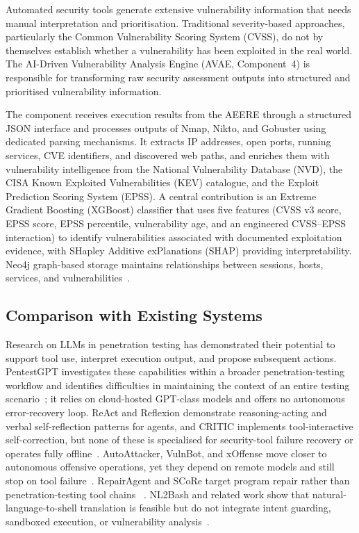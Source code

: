 Automated security tools generate extensive vulnerability information that
needs manual interpretation and prioritisation. Traditional severity-based
approaches, particularly the Common Vulnerability Scoring System (CVSS), do not
by themselves establish whether a vulnerability has been exploited in the
real world. The AI-Driven Vulnerability Analysis Engine (AVAE, Component~4) is
responsible for transforming raw security assessment outputs into structured and
prioritised vulnerability information.

The component receives execution results from the AEERE through a structured
JSON interface and processes outputs of Nmap, Nikto, and Gobuster using dedicated
parsing mechanisms. It extracts IP addresses, open ports, running services, CVE
identifiers, and discovered web paths, and enriches them with vulnerability
intelligence from the National Vulnerability Database (NVD), the CISA Known
Exploited Vulnerabilities (KEV) catalogue, and the Exploit Prediction Scoring
System (EPSS). A central contribution is an Extreme Gradient Boosting (XGBoost)
classifier that uses five features (CVSS v3 score, EPSS score, EPSS percentile,
vulnerability age, and an engineered CVSS--EPSS interaction) to identify
vulnerabilities associated with documented exploitation evidence, with SHapley
Additive exPlanations (SHAP) providing interpretability. Neo4j graph-based
storage maintains relationships between sessions, hosts, services, and
vulnerabilities~\cite{bozorgi2010beyond,sabottke2015vulnerability,lundberg2017shap,
chen2016xgboost,jacobs2023epss}.

\subsection{Comparison with Existing Systems}\label{sec:existing}

Research on LLMs in penetration testing has demonstrated their potential to
support tool use, interpret execution output, and propose subsequent actions.
PentestGPT investigates these capabilities within a broader penetration-testing
workflow and identifies difficulties in maintaining the context of an entire
testing scenario~\cite{deng2024pentestgpt}; it relies on cloud-hosted GPT-class
models and offers no autonomous error-recovery loop. ReAct and Reflexion
demonstrate reasoning-acting and verbal self-reflection patterns for agents, and
CRITIC implements tool-interactive self-correction, but none of these is
specialised for security-tool failure recovery or operates fully
offline~\cite{yao2023react,shinn2023reflexion,gou2024critic}. AutoAttacker,
VulnBot, and xOffense move closer to autonomous offensive operations, yet they
depend on remote models and still stop on tool
failure~\cite{autoattacker2024,vulnbot2025,xoffense2025}. RepairAgent and SCoRe
target program repair rather than penetration-testing tool chains
~\cite{repairagent2024,score2024}. NL2Bash and related work show that
natural-language-to-shell translation is feasible but do not integrate intent
guarding, sandboxed execution, or vulnerability analysis~\cite{nl2bash2018}.

